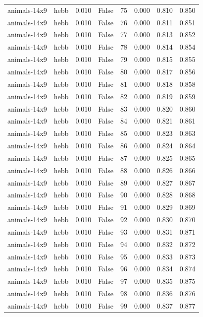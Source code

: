 \begin{tabular}{llrrrrrr}
animals-14x9 & hebb & 0.010 & False & 75 & 0.000 & 0.810 & 0.850 \\
animals-14x9 & hebb & 0.010 & False & 76 & 0.000 & 0.811 & 0.851 \\
animals-14x9 & hebb & 0.010 & False & 77 & 0.000 & 0.813 & 0.852 \\
animals-14x9 & hebb & 0.010 & False & 78 & 0.000 & 0.814 & 0.854 \\
animals-14x9 & hebb & 0.010 & False & 79 & 0.000 & 0.815 & 0.855 \\
animals-14x9 & hebb & 0.010 & False & 80 & 0.000 & 0.817 & 0.856 \\
animals-14x9 & hebb & 0.010 & False & 81 & 0.000 & 0.818 & 0.858 \\
animals-14x9 & hebb & 0.010 & False & 82 & 0.000 & 0.819 & 0.859 \\
animals-14x9 & hebb & 0.010 & False & 83 & 0.000 & 0.820 & 0.860 \\
animals-14x9 & hebb & 0.010 & False & 84 & 0.000 & 0.821 & 0.861 \\
animals-14x9 & hebb & 0.010 & False & 85 & 0.000 & 0.823 & 0.863 \\
animals-14x9 & hebb & 0.010 & False & 86 & 0.000 & 0.824 & 0.864 \\
animals-14x9 & hebb & 0.010 & False & 87 & 0.000 & 0.825 & 0.865 \\
animals-14x9 & hebb & 0.010 & False & 88 & 0.000 & 0.826 & 0.866 \\
animals-14x9 & hebb & 0.010 & False & 89 & 0.000 & 0.827 & 0.867 \\
animals-14x9 & hebb & 0.010 & False & 90 & 0.000 & 0.828 & 0.868 \\
animals-14x9 & hebb & 0.010 & False & 91 & 0.000 & 0.829 & 0.869 \\
animals-14x9 & hebb & 0.010 & False & 92 & 0.000 & 0.830 & 0.870 \\
animals-14x9 & hebb & 0.010 & False & 93 & 0.000 & 0.831 & 0.871 \\
animals-14x9 & hebb & 0.010 & False & 94 & 0.000 & 0.832 & 0.872 \\
animals-14x9 & hebb & 0.010 & False & 95 & 0.000 & 0.833 & 0.873 \\
animals-14x9 & hebb & 0.010 & False & 96 & 0.000 & 0.834 & 0.874 \\
animals-14x9 & hebb & 0.010 & False & 97 & 0.000 & 0.835 & 0.875 \\
animals-14x9 & hebb & 0.010 & False & 98 & 0.000 & 0.836 & 0.876 \\
animals-14x9 & hebb & 0.010 & False & 99 & 0.000 & 0.837 & 0.877 \\

\end{tabular}
